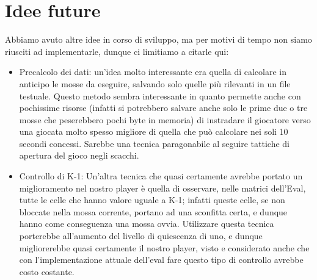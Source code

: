 \documentclass{article}
\begin{document}
\section{Idee future}
Abbiamo avuto altre idee in corso di sviluppo, ma per motivi di tempo non siamo riusciti ad implementarle, dunque ci limitiamo a citarle qui:
\begin{itemize}
    \item Precalcolo dei dati: un'idea molto interessante era quella di calcolare in anticipo le mosse da eseguire, salvando solo quelle più rilevanti in un file testuale. 
    Questo metodo sembra interessante in quanto permette anche con pochissime risorse (infatti si potrebbero salvare anche solo le prime due o tre mosse che peserebbero pochi byte in memoria) di instradare il giocatore verso una giocata molto spesso migliore di quella che può calcolare nei soli 10 secondi concessi. Sarebbe una tecnica paragonabile al seguire tattiche di apertura del gioco negli scacchi.
    
    \item Controllo di K-1: Un'altra tecnica che quasi certamente avrebbe portato un miglioramento nel nostro player è quella di osservare, nelle matrici dell'Eval, tutte le celle che hanno valore uguale a K-1; infatti queste celle, se non bloccate nella mossa corrente, portano ad una sconfitta certa, e dunque hanno come conseguenza una mossa ovvia. Utilizzare questa tecnica porterebbe all'aumento del livello di quiescenza di uno, e dunque migliorerebbe quasi certamente il nostro player, visto e considerato anche che con l'implementazione attuale dell'eval fare questo tipo di controllo avrebbe costo costante.
\end{itemize}
\end{document}

